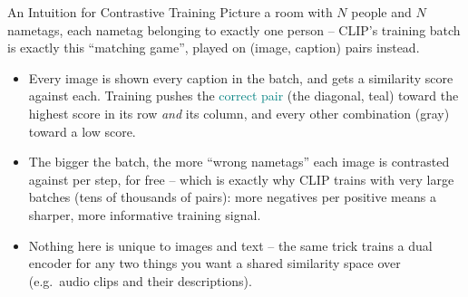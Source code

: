 \begin{vbframe}{An Intuition for Contrastive Training}
Picture a room with $N$ people and $N$ nametags, each nametag belonging to exactly one person -- CLIP's training batch is exactly this ``matching game'', played on (image, caption) pairs instead.

\begin{center}
\end{center}

\begin{itemize}
  \item Every image is shown every caption in the batch, and gets a similarity score against each. Training pushes the \textcolor{teal}{correct pair} (the diagonal, teal) toward the highest score in its row \emph{and} its column, and every other combination (gray) toward a low score.
  \item The bigger the batch, the more ``wrong nametags'' each image is contrasted against per step, for free -- which is exactly why CLIP trains with very large batches (tens of thousands of pairs): more negatives per positive means a sharper, more informative training signal.
  \item Nothing here is unique to images and text -- the same trick trains a dual encoder for any two things you want a shared similarity space over (e.g.\ audio clips and their descriptions).
\end{itemize}
\end{vbframe}

